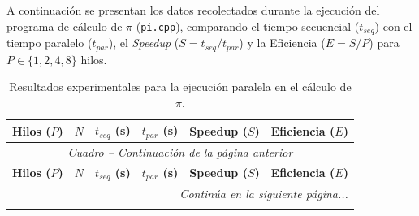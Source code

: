\documentclass[11pt,a4paper]{article}
\begin{document}
A continuación se presentan los datos recolectados durante la ejecución del programa de cálculo de $\pi$ (\texttt{pi.cpp}), comparando el tiempo secuencial ($t_{seq}$) con el tiempo paralelo ($t_{par}$), el \textit{Speedup} ($S = t_{seq} / t_{par}$) y la Eficiencia ($E = S / P$) para $P \in \{1, 2, 4, 8\}$ hilos.

\renewcommand{\arraystretch}{1.35}
\small
\begin{longtable}{ccrrrr}
\caption{Resultados experimentales para la ejecución paralela en el cálculo de $\pi$.} \label{tab:resultados_pi} \\
\hline
\textbf{Hilos ($P$)} & \textbf{$N$} & \textbf{$t_{seq}$ (s)} & \textbf{$t_{par}$ (s)} & \textbf{Speedup ($S$)} & \textbf{Eficiencia ($E$)} \\ \hline
\endfirsthead

\multicolumn{6}{c}{\small \textit{Cuadro \thetable{} -- Continuación de la página anterior}} \\[0.5em]
\hline
\textbf{Hilos ($P$)} & \textbf{$N$} & \textbf{$t_{seq}$ (s)} & \textbf{$t_{par}$ (s)} & \textbf{Speedup ($S$)} & \textbf{Eficiencia ($E$)} \\ \hline
\endhead

\hline
\multicolumn{6}{r}{\textit{Continúa en la siguiente página...}} \\
\endfoot

\hline
\endlastfoot


\end{longtable}
\end{document}
